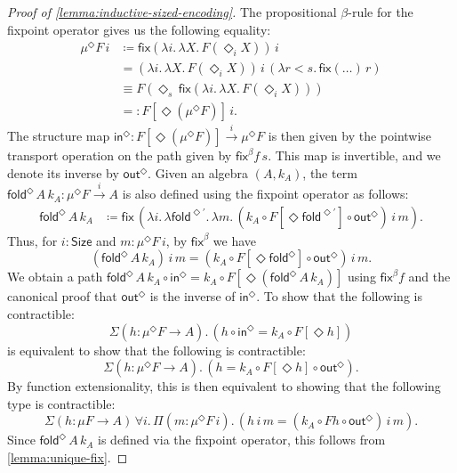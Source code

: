 \documentclass[10pt,a4paper]{article}
\theoremstyle{definition}
\theoremstyle{remark}
\renewcommand{\.}{.\,} %
\renewcommand{\:}{:} %
\newcommand{\Size}{\mathsf{Size}}
\newcommand{\fix}{\mathsf{fix}}
\newcommand{\fold}{\mathsf{fold}}
\newcommand{\In}{\mathsf{in}}
\newcommand{\out}{\mathsf{out}}
\newcommand{\sto}{\overset{i}{\to}}
\newcommand{\0}{\mathbf{0}}
\newcommand{\1}{\mathbf{1}}
\newcommand\<\langle
\renewcommand\>\rangle
\theoremstyle{remark}
\begin{document}
\begin{proof}[Proof of \autoref{lemma:inductive-sized-encoding}]
    The propositional \( \beta \)-rule for the fixpoint operator gives us the following equality:
    \begin{align*}
        \mu^\Diamond F \, i &\coloneqq \fix (\lambda i \. \lambda X\. F(\Diamond_i X)) \, i \\
        &= (\lambda i \. \lambda X\. F(\Diamond_i X)) \, i \, (\lambda r < s \. \fix (\dots) \, r) \\
        &\equiv F(\Diamond_s \, \fix (\lambda i \. \lambda X\. F(\Diamond_i X)) ) \\
        & =: F [\Diamond (\mu^\Diamond F)] \, i
    .\end{align*}
    The structure map \( \In^\Diamond : F[\Diamond (\mu^\Diamond F)] \sto \mu^\Diamond F \) is then given by the pointwise transport operation on the path given by $\fix^\beta f \, s$. This map is invertible, and we denote its inverse by $\out^\Diamond$. Given an algebra \( (A, k_A) \), the term \( \fold^\Diamond \, A \, k_A : \mu^\Diamond F \sto A\) is also defined using the fixpoint operator as follows:
    \begin{align*}
        \fold^\Diamond \, A \, k_A  &\coloneqq \fix \, (\lambda i \. \lambda \fold^{\Diamond'} \. \lambda m \. (k_A \circ F[\Diamond \fold^{\Diamond'}] \circ \mathsf{out}^\Diamond) \, i \, m).
    \end{align*}
    Thus, for $i : \Size$ and $m : \mu^\Diamond F \, i$, by $\fix^\beta$ we have
    \[
    (\fold^\Diamond \, A \, k_A) \, i \, m = (k_A \circ F[\Diamond \fold^{\Diamond}] \circ \mathsf{out}^\Diamond) \, i \, m.
    \]
    We obtain a path $\fold^\Diamond \, A \, k_A \circ \In^\Diamond = k_A \circ F[\Diamond (\fold^\Diamond \, A \, k_A)]$ using $\fix^\beta f$ and the canonical proof that $\out^\Diamond$ is the inverse of $\In^\Diamond$. 
    To show that the following is contractible: \[\Sigma{(h : \mu^\Diamond F \to A)} \. (h \circ \In^\Diamond = k_A \circ F[\Diamond h])\] is equivalent to show that the following is contractible: \[\Sigma{(h : \mu^\Diamond F \to A)} \. (h = k_A \circ F[\Diamond h] \circ \out^\Diamond).\] 
    By function extensionality, this is then equivalent to showing that the following type is contractible: \[\Sigma{(h : \mu F \to A)} \, \forall i \. \Pi{(m : \mu^\Diamond F \, i)} \. (h \, i \, m = (k_A \circ Fh \circ \out^\Diamond) \, i \, m).\]
    Since $\fold^\Diamond \, A \, k_A$ is defined via the fixpoint operator, this follows from \autoref{lemma:unique-fix}.
\end{proof}
\end{document}
